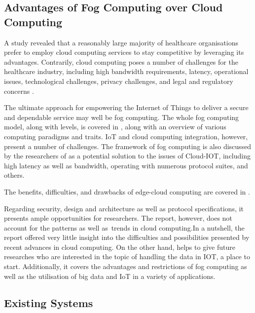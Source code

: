 \documentclass[10pt]{article}
\begin{document}
\subsection{Advantages of Fog Computing over Cloud Computing}

A study revealed that a reasonably large majority of healthcare organisations prefer to employ cloud computing services to stay competitive by leveraging its advantages. Contrarily, cloud computing poses a number of challenges for the healthcare industry, including high bandwidth requirements, latency, operational issues, technological challenges, privacy challenges, and legal and regulatory concerns \cite{7}.
\newline


The ultimate approach for empowering the Internet of Things to deliver a secure and dependable service may well be fog computing. 
The whole fog computing model, along with levels, is covered in \cite{10}, along with an overview of various computing paradigms and traits. 
IoT and cloud computing integration, however, present a number of challenges. The framework of fog computing is also discussed by the researchers of \cite{11} as a potential solution to the issues of Cloud-IOT, including high latency as well as bandwidth, operating with numerous protocol suites, and others. 
\newline

The benefits, difficulties, and drawbacks of edge-cloud computing are covered in \cite{12}. 

Regarding security, design and architecture as well as protocol specifications, it presents ample opportunities for researchers. The report, however, does not account for the patterns as well as trends in cloud computing.In a nutshell, the report offered very little insight into the difficulties and possibilities presented by recent advances in cloud computing. On the other hand, \cite{13} helps to give future researches who are interested in the topic of handling the data in IOT, a place to start. Additionally, it covers the advantages and restrictions of fog computing as well as the utilisation of big data and IoT in a variety of applications. 

\newline
\newline


\subsection{Existing Systems}
\end{document}
